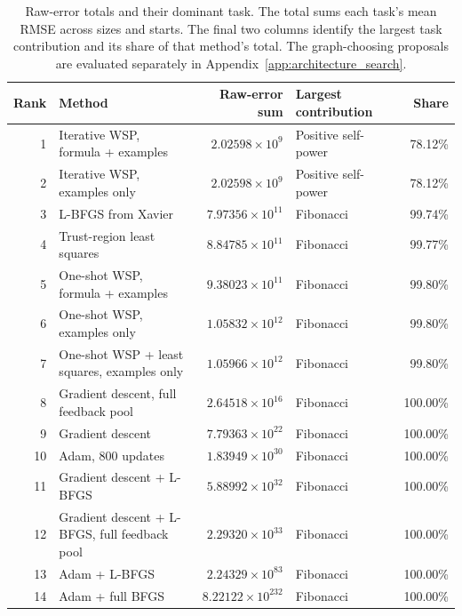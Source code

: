 \begin{table}[htbp]\centering\footnotesize
\caption{Raw-error totals and their dominant task. The total sums each task's mean RMSE across sizes and starts. The final two columns identify the largest task contribution and its share of that method's total. The graph-choosing proposals are evaluated separately in Appendix~\ref{app:architecture_search}.}\label{tab:holisticrank}
\begin{tabular*}{\linewidth}{@{\extracolsep{\fill}}rlrlr@{}}\toprule
Rank & Method & Raw-error sum & Largest contribution & Share \\\midrule
1 & Iterative WSP, formula + examples & $2.02598\times 10^{9}$ & Positive self-power & 78.12\%\\
2 & Iterative WSP, examples only & $2.02598\times 10^{9}$ & Positive self-power & 78.12\%\\
3 & L-BFGS from Xavier & $7.97356\times 10^{11}$ & Fibonacci & 99.74\%\\
4 & Trust-region least squares & $8.84785\times 10^{11}$ & Fibonacci & 99.77\%\\
5 & One-shot WSP, formula + examples & $9.38023\times 10^{11}$ & Fibonacci & 99.80\%\\
6 & One-shot WSP, examples only & $1.05832\times 10^{12}$ & Fibonacci & 99.80\%\\
7 & One-shot WSP + least squares, examples only & $1.05966\times 10^{12}$ & Fibonacci & 99.80\%\\
8 & Gradient descent, full feedback pool & $2.64518\times 10^{16}$ & Fibonacci & 100.00\%\\
9 & Gradient descent & $7.79363\times 10^{22}$ & Fibonacci & 100.00\%\\
10 & Adam, 800 updates & $1.83949\times 10^{30}$ & Fibonacci & 100.00\%\\
11 & Gradient descent + L-BFGS & $5.88992\times 10^{32}$ & Fibonacci & 100.00\%\\
12 & Gradient descent + L-BFGS, full feedback pool & $2.29320\times 10^{33}$ & Fibonacci & 100.00\%\\
13 & Adam + L-BFGS & $2.24329\times 10^{83}$ & Fibonacci & 100.00\%\\
14 & Adam + full BFGS & $8.22122\times 10^{232}$ & Fibonacci & 100.00\%\\
\bottomrule\end{tabular*}\end{table}
